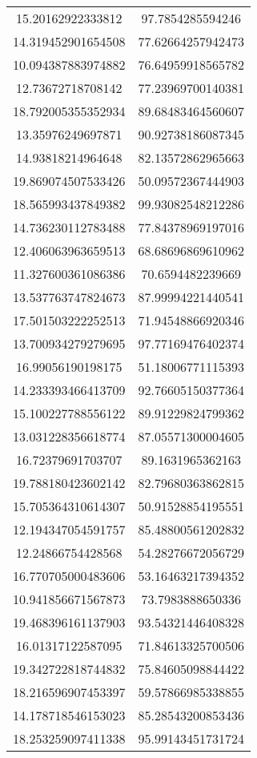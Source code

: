 \begin{table}
\begin{tabular}{cc}
15.20162922333812 & 97.7854285594246 \\
14.319452901654508 & 77.62664257942473 \\
10.094387883974882 & 76.64959918565782 \\
12.73672718708142 & 77.23969700140381 \\
18.792005355352934 & 89.68483464560607 \\
13.35976249697871 & 90.92738186087345 \\
14.93818214964648 & 82.13572862965663 \\
19.869074507533426 & 50.09572367444903 \\
18.565993437849382 & 99.93082548212286 \\
14.736230112783488 & 77.84378969197016 \\
12.406063963659513 & 68.68696869610962 \\
11.327600361086386 & 70.6594482239669 \\
13.537763747824673 & 87.99994221440541 \\
17.501503222252513 & 71.94548866920346 \\
13.700934279279695 & 97.77169476402374 \\
16.99056190198175 & 51.18006771115393 \\
14.233393466413709 & 92.76605150377364 \\
15.100227788556122 & 89.91229824799362 \\
13.031228356618774 & 87.05571300004605 \\
16.72379691703707 & 89.1631965362163 \\
19.788180423602142 & 82.79680363862815 \\
15.705364310614307 & 50.91528854195551 \\
12.194347054591757 & 85.48800561202832 \\
12.24866754428568 & 54.28276672056729 \\
16.770705000483606 & 53.16463217394352 \\
10.941856671567873 & 73.7983888650336 \\
19.468396161137903 & 93.54321446408328 \\
16.01317122587095 & 71.84613325700506 \\
19.342722818744832 & 75.84605098844422 \\
18.216596907453397 & 59.57866985338855 \\
14.178718546153023 & 85.28543200853436 \\
18.253259097411338 & 95.99143451731724 \\

\end{tabular}
\end{table}
